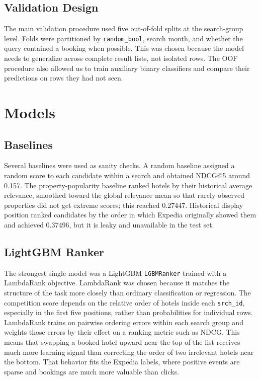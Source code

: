 \documentclass[runningheads]{llncs}
\begin{document}
\subsection{Validation Design}

The main validation procedure used five out-of-fold splits at the search-group level.  Folds were partitioned by \texttt{random\_bool}, search month, and whether the query contained a booking when possible.  This was chosen because the model needs to generalize across complete result lists, not isolated rows.  The OOF procedure also allowed us to train auxiliary binary classifiers and compare their predictions on rows they had not seen.

\section{Models}

\subsection{Baselines}

Several baselines were used as sanity checks.  A random baseline assigned a random score to each candidate within a search and obtained NDCG@5 around 0.157.  The property-popularity baseline ranked hotels by their historical average relevance, smoothed toward the global relevance mean so that rarely observed properties did not get extreme scores; this reached 0.27447.  Historical display position ranked candidates by the order in which Expedia originally showed them and achieved 0.37496, but it is leaky and unavailable in the test set.

\subsection{LightGBM Ranker}

The strongest single model was a LightGBM \texttt{LGBMRanker} trained with a LambdaRank objective.  LambdaRank was chosen because it matches the structure of the task more closely than ordinary classification or regression.  The competition score depends on the relative order of hotels inside each \texttt{srch\_id}, especially in the first five positions, rather than probabilities for individual rows.  LambdaRank trains on pairwise ordering errors within each search group and weights those errors by their effect on a ranking metric such as NDCG.  This means that swapping a booked hotel upward near the top of the list receives much more learning signal than correcting the order of two irrelevant hotels near the bottom.  That behavior fits the Expedia labels, where positive events are sparse and bookings are much more valuable than clicks.
\end{document}
